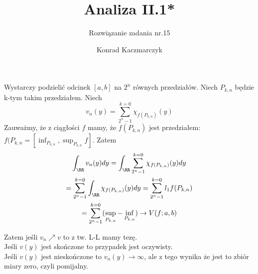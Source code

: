 \documentclass[11pt]{scrartcl}
\author{Konrad Kaczmarczyk}
\begin{document}
  \title{Analiza II.1*}
  \subtitle{Rozwiązanie zadania nr.15}
  \maketitle
  Wystarczy podzielić odcinek $[a,b]$ na $2^n$ równych przedziałów. Niech $P_{k,n}$ będzie k-tym takim przedziałem. Niech
   \[
    v_n (y) = \sum_{2^n - 1}^{k = 0} \chi_{f(P_{k,n})} (y)  
   \]
   Zauważmy, że z ciągłości $f$ mamy, że  $f(P_{k,n})$ jest przedziałem:
   $f(P_{k,n} = \left [ \inf_{P_{k,n}}, \sup_{P_{k,n}} f \right ]$. Zatem
   \begin{gather*}
     \int_{\RR} v_n (y) dy = \int_{\RR} \sum_{2^n - 1}^{k = 0} \chi_{f(P_{k,n})} (y) dy \\
     = \sum_{2^n - 1}^{k = 0}  \int_{\RR} \chi_{f(P_{k,n})} (y) dy = \sum_{2^n - 1}^{k = 0} l_1 f(P_{k,n}) \\ 
     = \sum_{2^n - 1}^{k = 0} (\sup_{P_{k,n}} - \inf_{P_{k,n}}) \to V(f; a, b)
   \end{gather*}

   Zatem jeśli $v_n \nearrow v$ to z tw. L-L mamy tezę. \\



   Jeśli $v(y)$ jest skończone to przypadek jest oczywisty. \\
   Jeśli $v(y)$ jest nieskończone to $v_n(y) \to \infty $, ale z tego wynika że jest to zbiór miary zero, czyli pomijalny.
\end{document}
